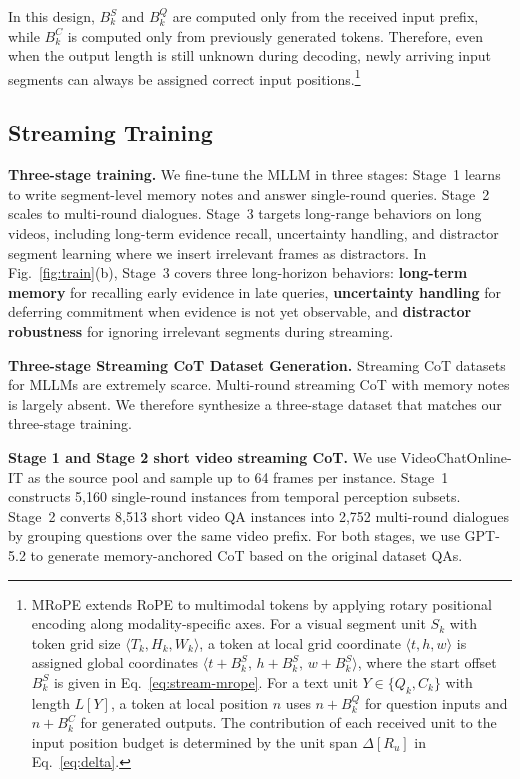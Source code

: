 \documentclass{article}
\begin{document}
\noindent In this design, $B_k^{S}$ and $B_k^{Q}$ are computed only from the received input prefix, while $B_k^{C}$ is computed only from previously generated tokens. Therefore, even when the output length is still unknown during decoding, newly arriving input segments can always be assigned correct input positions.\footnote{MRoPE extends RoPE to multimodal tokens by applying rotary positional encoding along modality-specific axes. For a visual segment unit $S_k$ with token grid size $\langle T_k,H_k,W_k\rangle$, a token at local grid coordinate $\langle t,h,w\rangle$ is assigned global coordinates $\langle t+B_k^{S},\,h+B_k^{S},\,w+B_k^{S}\rangle$, where the start offset $B_k^{S}$ is given in Eq.~\eqref{eq:stream-mrope}. For a text unit $Y\in\{Q_k,C_k\}$ with length $L[Y]$, a token at local position $n$ uses $n+B_k^{Q}$ for question inputs and $n+B_k^{C}$ for generated outputs. The contribution of each received unit to the input position budget is determined by the unit span $\Delta[R_u]$ in Eq.~\eqref{eq:delta}.}

\subsection{Streaming Training}
\label{sec:method:data}

\noindent\textbf{Three-stage training.}
We fine-tune the MLLM in three stages: Stage~1 learns to write segment-level memory notes and answer single-round queries. Stage~2 scales to multi-round dialogues. Stage~3 targets long-range behaviors on long videos, including long-term evidence recall, uncertainty handling, and distractor segment learning where we insert irrelevant frames as distractors. In Fig.~\ref{fig:train}(b), Stage~3 covers three long-horizon behaviors: \textbf{long-term memory} for recalling early evidence in late queries, \textbf{uncertainty handling} for deferring commitment when evidence is not yet observable, and \textbf{distractor robustness} for ignoring irrelevant segments during streaming.

\noindent\textbf{Three-stage Streaming CoT Dataset Generation.}
Streaming CoT \cite{DBLP:journals/corr/abs-2510-25332} datasets for MLLMs are extremely scarce. Multi-round streaming CoT with memory notes is largely absent. We therefore synthesize a three-stage dataset that matches our three-stage training.

\noindent\textbf{Stage 1 and Stage 2 short video streaming CoT.}
We use VideoChatOnline-IT \cite{huang2024online} as the source pool and sample up to 64 frames per instance. Stage~1 constructs 5,160 single-round instances from temporal perception subsets. Stage~2 converts 8,513 short video QA instances into 2,752 multi-round dialogues by grouping questions over the same video prefix. For both stages, we use GPT-5.2 to generate memory-anchored CoT based on the original dataset QAs.
\end{document}
